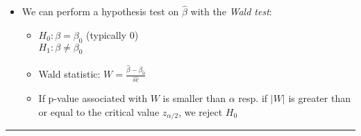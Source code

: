 \begin{itemize}
\begin{itemize}
    \end{itemize}
    \item We can perform a hypothesis test on $\hat{\beta}$ with the \emph{Wald test}:
    \begin{itemize}
        \item $H_0 : \beta = \beta_0$ (typically 0)\\
        $H_1 : \beta \neq \beta_0$
        \item Wald statistic: $W = \frac{\hat{\beta} - \beta_0}{\hat{se}}$
        \item If p-value associated with $W$ is smaller than $\alpha$ resp. if $|W|$ is greater than or equal to the critical value $z_{\alpha/2}$, we reject $H_0$
    \end{itemize}
\end{itemize}

{\color{lightgray}\hrule height 0.001mm}

